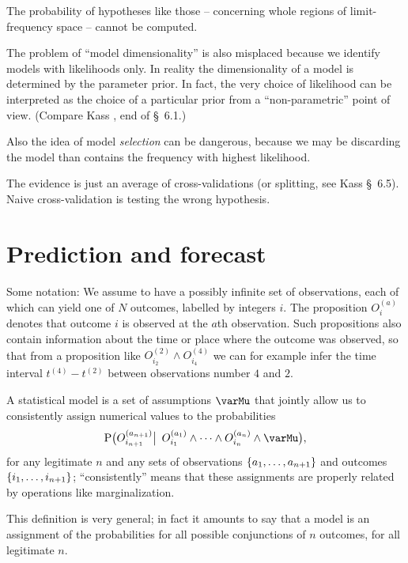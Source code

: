 \documentclass[\ifafour a4paper,12pt,\else a5paper,10pt,\fi%
onecolumn,oneside,article,%
british%
]{memoir}
\theoremstyle{remark}
\theoremstyle{innote}
\newcommand*{\citey}{\parencites*}
\DeclarePairedDelimiter\set{\{}{\}}
\newcommand*{\p}{\mathrm{P}}%
\renewcommand*{\|}{\mathpunct{|}}
\newcommand*{\bigcond}{\mathpunct{\big|\ }}%
\newcommand*{\sect}{\S}%
\newcommand*{\yO}[2]{O^{(#1)}_{#2}}
\newcommand*{\yM}{\varMu}
\begin{document}
The probability of hypotheses like those -- concerning whole regions of
limit-frequency space -- cannot be computed.

The problem of \enquote{model dimensionality} is also misplaced because we
identify models with likelihoods only. In reality the dimensionality of a
model is determined by the parameter prior. In fact, the very choice of
likelihood can be interpreted as the choice of a particular prior from a
\enquote{non-parametric} point of view. (Compare Kass \citey{kassetal1995},
end of \sect~6.1.)

Also the idea of model \emph{selection} can be dangerous, because we may be
discarding the model than contains the frequency with highest likelihood.

The evidence is just an average of cross-validations (or splitting, see
Kass \sect~6.5). Naive cross-validation is testing the wrong hypothesis.



\section{Prediction and forecast}
\label{sec:intro}

Some notation: We assume to have a possibly infinite set of observations,
each of which can yield one of $N$ outcomes, labelled by integers $i$. The
proposition $\yO{a}{i}$ denotes that outcome $i$ is observed at the $a$th
observation. Such propositions also contain information about the time or
place where the outcome was observed, so that from a proposition like
$\yO{2}{i_2} \land \yO{4}{i_4}$ we can for example infer the time interval
$t^{(4)}-t^{(2)}$ between observations number $4$ and $2$.

A statistical model is a set of assumptions $\yM$ that jointly allow us to
consistently assign numerical values to the probabilities
\begin{equation}
  \label{eq:def_statmod}
  \p\bigl(\yO{a_{n+1}}{i_{n+1}} \bigcond
  \yO{a_{1}}{i_{1}} \land \dotsb \land \yO{a_{n}}{i_{n}} \land \yM \bigr),
\end{equation}
for any legitimate $n$ and any sets of observations
$\set{a_{1}, \dotsc, a_{n+1}}$ and outcomes $\set{i_{1}, \dotsc, i_{n+1}}$;
\enquote{consistently} means that these assignments are properly related by
operations like marginalization.

This definition is very general; in fact it amounts to say that a model is
an assignment of the probabilities for all possible conjunctions of $n$
outcomes, for all legitimate $n$.
\end{document}
